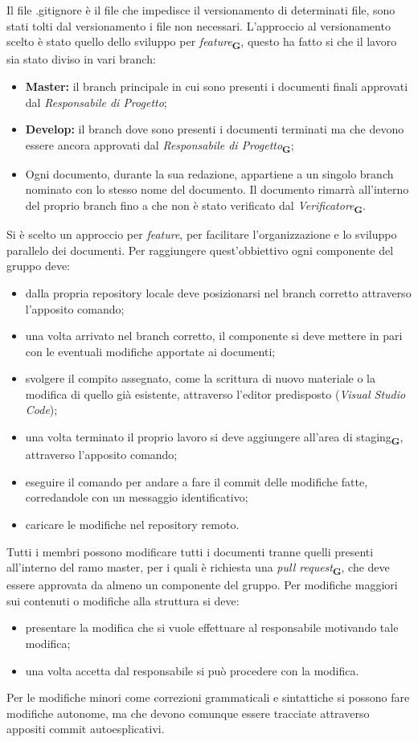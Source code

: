 Il file {\selectfont .gitignore} è il file che impedisce il versionamento di determinati file, sono stati tolti dal versionamento i file non necessari.
L'approccio al versionamento scelto è stato quello dello sviluppo per \textit{feature}\textsubscript{\textbf{G}}, questo ha fatto si che il lavoro sia stato diviso in vari branch:
\begin{itemize}
    \item \textbf{Master:} il branch principale in cui sono presenti i documenti finali approvati dal \textit{Responsabile di Progetto};
    \item \textbf{Develop:} il branch dove sono presenti i documenti terminati ma che devono essere ancora approvati dal \textit{Responsabile di Progetto}\textsubscript{\textbf{G}};
    \item Ogni documento, durante la sua redazione, appartiene a un singolo branch nominato con lo stesso nome del documento. Il documento rimarrà all'interno del proprio branch fino a che non è stato verificato dal \textit{Verificatore}\textsubscript{\textbf{G}}.
\end{itemize}
Si è scelto un approccio per \textit{feature}, per facilitare l'organizzazione e lo sviluppo parallelo dei documenti. Per raggiungere quest'obbiettivo ogni componente del gruppo deve:
\begin{itemize}
    \item dalla propria repository locale deve posizionarsi nel branch corretto attraverso l'apposito comando;
    \item una volta arrivato nel branch corretto, il componente si deve mettere in pari con le eventuali modifiche apportate ai documenti;
    \item svolgere il compito assegnato, come la scrittura di nuovo materiale o la modifica di quello già esistente, attraverso l'editor predisposto (\textit{Visual Studio Code});
    \item una volta terminato il proprio lavoro si deve aggiungere all'area di staging\textsubscript{\textbf{G}}, attraverso l'apposito comando;
    \item eseguire il comando per andare a fare il commit delle modifiche fatte, corredandole con un messaggio identificativo;
    \item caricare le modifiche nel repository remoto.
\end{itemize}
Tutti i membri possono modificare tutti i documenti tranne quelli presenti all'interno del ramo master, per i quali è richiesta una \textit{pull request}\textsubscript{\textbf{G}}, che deve essere approvata da almeno un componente del gruppo.
Per modifiche maggiori sui contenuti o modifiche alla struttura si deve:
\begin{itemize}
    \item presentare la modifica che si vuole effettuare al responsabile motivando tale modifica;
    \item una volta accetta dal responsabile si può procedere con la modifica.
\end{itemize}
Per le modifiche minori come correzioni grammaticali e sintattiche si possono fare modifiche autonome, ma che devono comunque essere tracciate attraverso appositi commit autoesplicativi.

